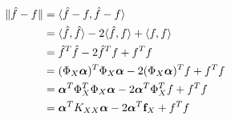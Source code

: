 \documentclass[twoside]{article} \usepackage{aistats2017}
\theoremstyle{definition}
\newcommand{\ds}[1]{{#1}}
\begin{document}
		\begin{equation}
		\begin{aligned}
			\Vert \hat{f} - f \Vert &= \langle \hat{f} - f, \hat{f} - f \rangle \\
			&= \langle \hat{f}, \hat{f} \rangle - 2 \langle \hat{f}, f \rangle + \langle f, f \rangle \\
			&=  \hat{f}^{T} \hat{f} - 2 \hat{f}^{T} f + f^{T} f \\
			&= (\Phi_{\ds{X}} \bm{\alpha})^{T} \Phi_{\ds{X}}  \bm{\alpha} - 2 (\Phi_{\ds{X}}  \bm{\alpha})^{T} f + f^{T} f \\
			&= \bm{\alpha}^{T} \Phi_{\ds{X}} ^{T} \Phi_{\ds{X}}  \bm{\alpha} - 2 \bm{\alpha}^{T} \Phi_{\ds{X}} ^{T} f + f^{T} f \\
			&= \bm{\alpha}^{T} K_{\ds{X} \ds{X}}  \bm{\alpha} - 2 \bm{\alpha}^{T} \bvec{f}_{\ds{X}} + f^{T} f \\
			\end{aligned}
		\label{eq:approximate_embedding_derivation}
		\end{equation}
\end{document}
